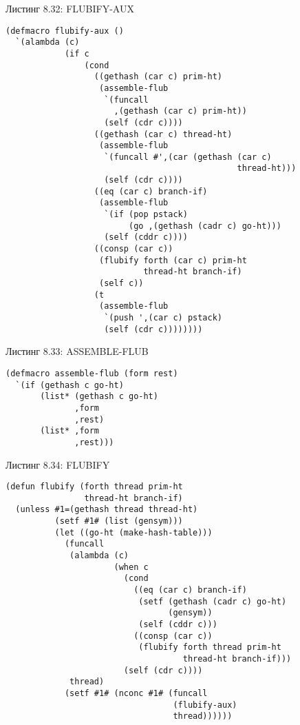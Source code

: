 \begin{figure}Листинг 8.32: FLUBIFY-AUX\label{listing_8.32}
\listbegin
\begin{verbatim}
(defmacro flubify-aux ()
  `(alambda (c)
            (if c
                (cond
                  ((gethash (car c) prim-ht)
                   (assemble-flub
                    `(funcall
                      ,(gethash (car c) prim-ht))
                    (self (cdr c))))
                  ((gethash (car c) thread-ht)
                   (assemble-flub
                    `(funcall #',(car (gethash (car c)
                                               thread-ht)))
                    (self (cdr c))))
                  ((eq (car c) branch-if)
                   (assemble-flub
                    `(if (pop pstack)
                         (go ,(gethash (cadr c) go-ht)))
                    (self (cddr c))))
                  ((consp (car c))
                   (flubify forth (car c) prim-ht
                            thread-ht branch-if)
                   (self c))
                  (t
                   (assemble-flub
                    `(push ',(car c) pstack)
                    (self (cdr c))))))))
\end{verbatim}
\listend
\end{figure}

\begin{figure}Листинг 8.33: ASSEMBLE-FLUB\label{listing_8.33}
\listbegin
\begin{verbatim}
(defmacro assemble-flub (form rest)
  `(if (gethash c go-ht)
       (list* (gethash c go-ht)
              ,form
              ,rest)
       (list* ,form
              ,rest)))
\end{verbatim}
\listend
\end{figure}

\begin{figure}Листинг 8.34: FLUBIFY\label{listing_8.34}
\listbegin
\begin{verbatim}
(defun flubify (forth thread prim-ht
                thread-ht branch-if)
  (unless #1=(gethash thread thread-ht)
          (setf #1# (list (gensym)))
          (let ((go-ht (make-hash-table)))
            (funcall
             (alambda (c)
                      (when c
                        (cond
                          ((eq (car c) branch-if)
                           (setf (gethash (cadr c) go-ht)
                                 (gensym))
                           (self (cddr c)))
                          ((consp (car c))
                           (flubify forth thread prim-ht
                                    thread-ht branch-if)))
                        (self (cdr c))))
             thread)
            (setf #1# (nconc #1# (funcall
                                  (flubify-aux)
                                  thread))))))
\end{verbatim}
\listend
\end{figure}

